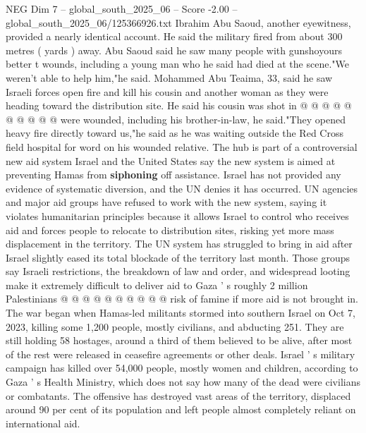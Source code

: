 \begin{textsample}{NEG Dim 7 – global\_south\_2025\_06 – Score -2.00 – global\_south\_2025\_06/125366926.txt}
Ibrahim Abu Saoud, another eyewitness, provided a nearly identical account.
He said the military fired from about 300 metres ( yards ) away.
Abu Saoud said he saw many people with gunshoyours better t wounds, including a young man who he said had died at the scene."We weren't able to help him,"he said.
Mohammed Abu Teaima, 33, said he saw Israeli forces open fire and kill his cousin and another woman as they were heading toward the distribution site.
He said his cousin was shot in @ @ @ @ @ @ @ @ @ @ were wounded, including his brother-in-law, he said."They opened heavy fire directly toward us,"he said as he was waiting outside the Red Cross field hospital for word on his wounded relative.
The hub is part of a controversial new aid system Israel and the United States say the new system is aimed at preventing Hamas from \textbf{siphoning} off assistance.
Israel has not provided any evidence of systematic diversion, and the UN denies it has occurred.
UN agencies and major aid groups have refused to work with the new system, saying it violates humanitarian principles because it allows Israel to control who receives aid and forces people to relocate to distribution sites, risking yet more mass displacement in the territory.
The UN system has struggled to bring in aid after Israel slightly eased its total blockade of the territory last month.
Those groups say Israeli restrictions, the breakdown of law and order, and widespread looting make it extremely difficult to deliver aid to Gaza ' s roughly 2 million Palestinians @ @ @ @ @ @ @ @ @ @ risk of famine if more aid is not brought in.
The war began when Hamas-led militants stormed into southern Israel on Oct 7, 2023, killing some 1,200 people, mostly civilians, and abducting 251.
They are still holding 58 hostages, around a third of them believed to be alive, after most of the rest were released in ceasefire agreements or other deals.
Israel ' s military campaign has killed over 54,000 people, mostly women and children, according to Gaza ' s Health Ministry, which does not say how many of the dead were civilians or combatants.
The offensive has destroyed vast areas of the territory, displaced around 90 per cent of its population and left people almost completely reliant on international aid.

\end{textsample}
